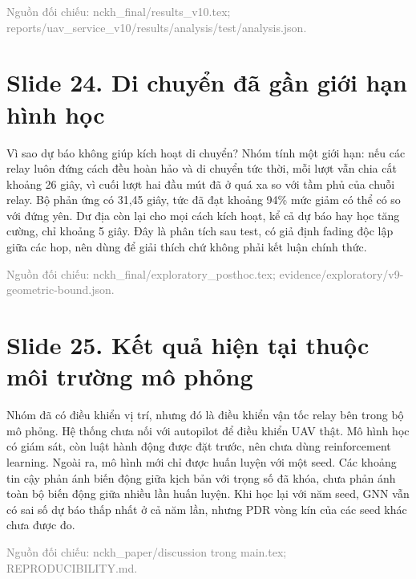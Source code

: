 {\small\textcolor{gray}{Nguồn đối chiếu: nckh\_final/results\_v10.tex; reports/uav\_service\_v10/results/analysis/test/analysis.json.}}




\section*{Slide 24. Di chuyển đã gần giới hạn hình học}


Vì sao dự báo không giúp kích hoạt di chuyển? Nhóm tính một giới hạn: nếu các relay luôn đứng cách đều hoàn hảo và di chuyển tức thời, mỗi lượt vẫn chia cắt khoảng 26 giây, vì cuối lượt hai đầu mút đã ở quá xa so với tầm phủ của chuỗi relay. Bộ phản ứng có 31,45 giây, tức đã đạt khoảng 94\% mức giảm có thể có so với đứng yên. Dư địa còn lại cho mọi cách kích hoạt, kể cả dự báo hay học tăng cường, chỉ khoảng 5 giây. Đây là phân tích sau test, có giả định fading độc lập giữa các hop, nên dùng để giải thích chứ không phải kết luận chính thức.

{\small\textcolor{gray}{Nguồn đối chiếu: nckh\_final/exploratory\_posthoc.tex; evidence/exploratory/v9-geometric-bound.json.}}




\section*{Slide 25. Kết quả hiện tại thuộc môi trường mô phỏng}


Nhóm đã có điều khiển vị trí, nhưng đó là điều khiển vận tốc relay bên trong bộ mô phỏng. Hệ thống chưa nối với autopilot để điều khiển UAV thật. Mô hình học có giám sát, còn luật hành động được đặt trước, nên chưa dùng reinforcement learning. Ngoài ra, mô hình mới chỉ được huấn luyện với một seed. Các khoảng tin cậy phản ánh biến động giữa kịch bản với trọng số đã khóa, chưa phản ánh toàn bộ biến động giữa nhiều lần huấn luyện. Khi học lại với năm seed, GNN vẫn có sai số dự báo thấp nhất ở cả năm lần, nhưng PDR vòng kín của các seed khác chưa được đo.

{\small\textcolor{gray}{Nguồn đối chiếu: nckh\_paper/discussion trong main.tex; REPRODUCIBILITY.md.}}



